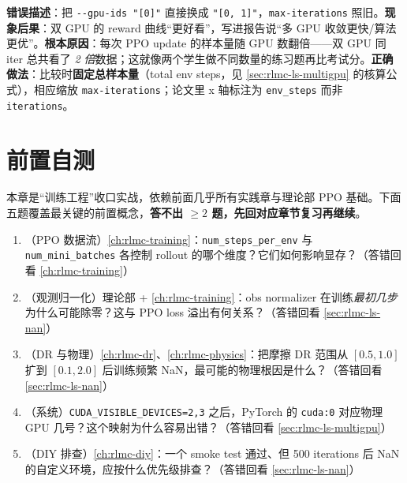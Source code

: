 \begin{pitfall}
\textbf{错误描述}：把 \verb|--gpu-ids "[0]"| 直接换成 \verb|"[0, 1]"|，\verb|max-iterations| 照旧。\textbf{现象后果}：双 GPU 的 reward 曲线“更好看”，写进报告说“多 GPU 收敛更快/算法更优”。\textbf{根本原因}：每次 PPO update 的样本量随 GPU 数翻倍——双 GPU 同 iter 总共看了 \emph{2 倍}数据；这就像两个学生做不同数量的练习题再比考试分。\textbf{正确做法}：比较时\textbf{固定总样本量}（total env steps，见 \cref{sec:rlmc-ls-multigpu} 的核算公式），相应缩放 \verb|max-iterations|；论文里 x 轴标注为 \texttt{env\_steps} 而非 \texttt{iterations}。
\end{pitfall}

\section{前置自测}
\label{sec:rlmc-ls-pretest}

本章是“训练工程”收口实战，依赖前面几乎所有实践章与理论部 PPO 基础。下面五题覆盖最关键的前置概念，\textbf{答不出 $\ge 2$ 题，先回对应章节复习再继续}。

\begin{practice}[开课前自测]
\begin{enumerate}
\item （PPO 数据流）\cref{ch:rlmc-training}：\verb|num_steps_per_env| 与 \verb|num_mini_batches| 各控制 rollout 的哪个维度？它们如何影响显存？（答错回看 \cref{ch:rlmc-training}）
\item （观测归一化）理论部 + \cref{ch:rlmc-training}：obs normalizer 在训练\emph{最初几步}为什么可能除零？这与 PPO loss 溢出有何关系？（答错回看 \cref{sec:rlmc-ls-nan}）
\item （DR 与物理）\cref{ch:rlmc-dr}、\cref{ch:rlmc-physics}：把摩擦 DR 范围从 $[0.5,1.0]$ 扩到 $[0.1,2.0]$ 后训练频繁 NaN，最可能的物理根因是什么？（答错回看 \cref{sec:rlmc-ls-nan}）
\item （系统）\verb|CUDA_VISIBLE_DEVICES=2,3| 之后，PyTorch 的 \verb|cuda:0| 对应物理 GPU 几号？这个映射为什么容易出错？（答错回看 \cref{sec:rlmc-ls-multigpu}）
\item （DIY 排查）\cref{ch:rlmc-diy}：一个 smoke test 通过、但 500 iterations 后 NaN 的自定义环境，应按什么优先级排查？（答错回看 \cref{sec:rlmc-ls-nan}）
\end{enumerate}
\end{practice}

